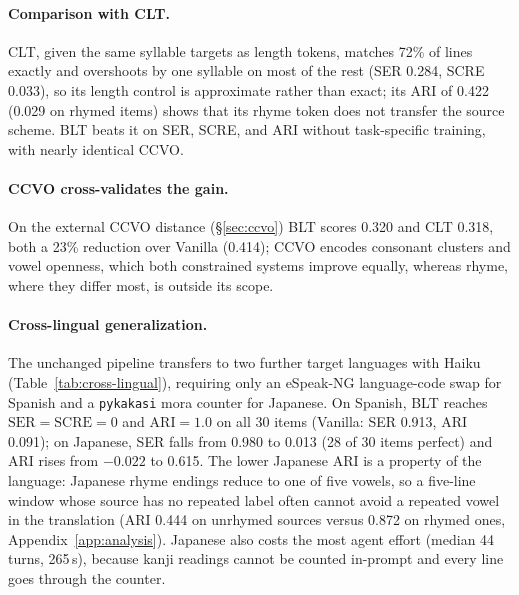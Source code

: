\documentclass[11pt]{article}
\begin{document}
\paragraph{Comparison with CLT.}
CLT, given the same syllable targets as length tokens, matches 72\% of lines exactly and overshoots by one syllable on most of the rest (SER 0.284, SCRE 0.033), so its length control is approximate rather than exact; its ARI of 0.422 (0.029 on rhymed items) shows that its rhyme token does not transfer the source scheme. BLT beats it on SER, SCRE, and ARI without task-specific training, with nearly identical CCVO.

\paragraph{CCVO cross-validates the gain.}
On the external CCVO distance (\S\ref{sec:ccvo}) BLT scores 0.320 and CLT 0.318, both a 23\% reduction over Vanilla (0.414); CCVO encodes consonant clusters and vowel openness, which both constrained systems improve equally, whereas rhyme, where they differ most, is outside its scope.

\paragraph{Cross-lingual generalization.}
The unchanged pipeline transfers to two further target languages with Haiku (Table~\ref{tab:cross-lingual}), requiring only an eSpeak-NG language-code swap for Spanish and a \texttt{pykakasi} mora counter for Japanese.
On Spanish, BLT reaches $\text{SER}{=}\text{SCRE}{=}0$ and $\text{ARI}{=}1.0$ on all 30 items (Vanilla: SER 0.913, ARI 0.091); on Japanese, SER falls from 0.980 to 0.013 (28 of 30 items perfect) and ARI rises from $-0.022$ to 0.615.
The lower Japanese ARI is a property of the language: Japanese rhyme endings reduce to one of five vowels, so a five-line window whose source has no repeated label often cannot avoid a repeated vowel in the translation (ARI 0.444 on unrhymed sources versus 0.872 on rhymed ones, Appendix~\ref{app:analysis}).
Japanese also costs the most agent effort (median 44 turns, 265\,s), because kanji readings cannot be counted in-prompt and every line goes through the counter.
\end{document}
